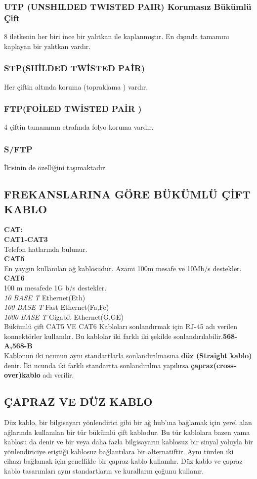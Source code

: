 \subsubsection{UTP (UNSHILDED TWISTED PAIR) Korumasız Bükümlü Çift}
8 iletkenin her biri ince bir yalıtkan ile kaplanmıştır. En dışında tamamını kaplayan bir yalıtkan vardır.

\subsubsection{STP(SHİLDED TWİSTED PAİR)}
Her çiftin altında koruma (topraklama ) vardır.

\subsubsection{FTP(FOİLED TWİSTED PAİR )}
4 çiftin tamamının etrafında folyo koruma vardır.
\subsubsection {S/FTP }
İkisinin de özelliğini taşımaktadır.
    
\subsection{FREKANSLARINA GÖRE BÜKÜMLÜ ÇİFT KABLO}
\textbf{CAT:}\\
\textbf{CAT1-CAT3} \\
Telefon hatlarında bulunur.\\
\textbf{CAT5} \\
En yaygın kullanılan ağ kablosudur. Azami 100m mesafe ve 10Mb/s destekler.\\
\textbf{CAT6} \\
100 m mesafede 1G b/s destekler.\\
\textit{10 BASE T} Ethernet(Eth)\\
\textit{100 BASE T} Fast Ethernet(Fa,Fe)\\
\textit{1000 BASE T} Gigabit Ethernet(G,GE)\\
Bükümlü çift CAT5 VE CAT6 Kabloları  sonlandırmak için RJ-45 adı verilen konnektörler kullanılır.
Bu kablolar iki farklı iki şekilde sonlandırılabilir.\textbf{568-A,568-B}\\
Kablonun iki ucunun aynı standartlarla sonlandırılmasına \textbf{düz (Straight kablo)} denir. İki ucunda iki farklı standartta sonlandırılma yapılırsa \textbf{çapraz(cross-over)kablo } adı verilir.
\subsection{ÇAPRAZ VE DÜZ KABLO}
Düz kablo, bir bilgisayarı yönlendirici gibi bir ağ hub'ına bağlamak için yerel alan ağlarında kullanılan bir tür bükümlü çift kablodur. Bu tür kablolara bazen yama kablosu da denir ve bir veya daha fazla bilgisayarın kablosuz bir sinyal yoluyla bir yönlendiriciye eriştiği kablosuz bağlantılara bir alternatiftir. Aynı türden iki cihazı bağlamak için genellikle bir çapraz kablo kullanılır. Düz kablo ve çapraz kablo tasarımları aynı standartların ve kuralların çoğunu kullanır.

